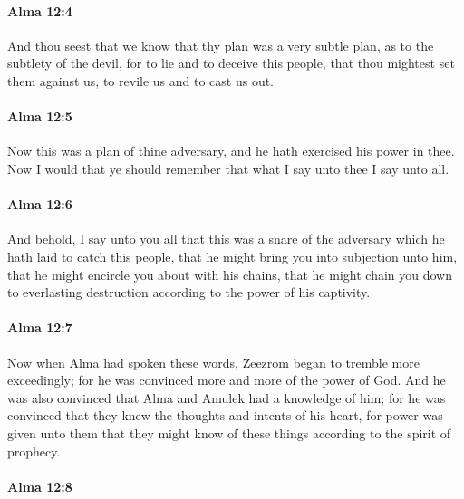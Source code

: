 		\paragraph{Alma 12:4} %
			\label{ALMA-12-4}

			And thou seest that we know that thy plan was a very subtle plan,
			as to the subtlety of the devil, for to lie and to deceive this people,
			that thou mightest set them against us,
			to revile us and to cast us out.

		\paragraph{Alma 12:5} %
			\label{ALMA-12-5}

			Now this was a plan of thine adversary,
			and he hath exercised his power in thee.
			Now I would that ye should remember
			that what I say unto thee I say unto all.

		\paragraph{Alma 12:6} %
			\label{ALMA-12-6}

			And behold, I say unto you all
			that this was a snare of the adversary
			which he hath laid to catch this people,
			that he might bring you into subjection unto him,
			that he might encircle you about with his chains,
			that he might chain you down to everlasting destruction
			according to the power of his captivity.

		\paragraph{Alma 12:7} %
			\label{ALMA-12-7}

			Now when Alma had spoken these words,
			Zeezrom began to tremble more exceedingly;
			for he was convinced more and more of the power of God.
			And he was also convinced that Alma and Amulek had a knowledge of him;
			for he was convinced that they knew the thoughts and intents of his heart,
			for power was given unto them
			that they might know of these things according to the spirit of prophecy.

		\paragraph{Alma 12:8} %
			\label{ALMA-12-8}

